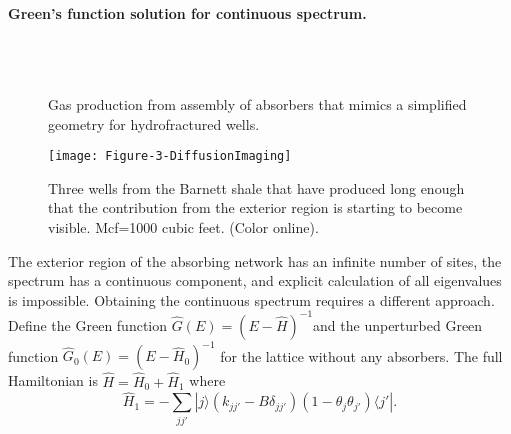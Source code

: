 \documentclass[english,notitlepage,twocolumn]{revtex4-1}
\begin{document}
\paragraph{Green's function solution for continuous spectrum.}

\begin{figure}[t]
\\
\\
\caption{Gas production from assembly of absorbers that mimics a simplified
geometry for hydrofractured wells.\label{fig:Gas-production-from-1}}
\end{figure}

\begin{figure}
\texttt{[image: Figure-3-DiffusionImaging]}

\caption{Three wells from the Barnett shale that have produced long enough
that the contribution from the exterior region is starting to become
visible. Mcf=1000 cubic feet. (Color online). \label{fig:Three-wells-from}}
\end{figure}

The exterior region of the absorbing network has an infinite number
of sites, the spectrum has a continuous component, and explicit calculation
of all eigenvalues is impossible. Obtaining the continuous spectrum
requires a different approach. Define the Green function \cite{Economou.83}
$\hat{G}(E)=\left(E-\hat{H}\right)^{-1}$and the unperturbed Green
function $\hat{G}_{0}(E)=\left(E-\hat{H}_{0}\right)^{-1}$ for the
lattice without any absorbers. The full Hamiltonian is $\hat{H}=\hat{H}_{0}+\hat{H}_{1}$
where
\begin{equation}
\hat{H}_{1}=-\sum_{jj'}|j\rangle\left(k_{jj'}-B\delta_{jj'}\right)\left(1-\theta_{j}\theta_{j'}\right)\langle j'|.\label{eq:H1-b}
\end{equation}
\end{document}

